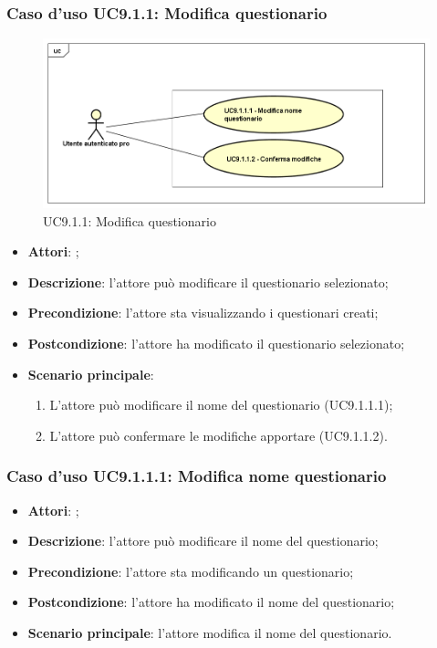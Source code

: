 			\subsubsection{Caso d'uso UC9.1.1: Modifica questionario}
			\label{UC9.1.1}
			\begin{figure}[h]
				\centering
			\includegraphics[scale=0.5,keepaspectratio]{UML/UC9_1_1.png}
				\caption{UC9.1.1: Modifica questionario}
			\end{figure}
			\FloatBarrier
			\begin{itemize}
				\item \textbf{Attori}: \uaupro{};
				\item \textbf{Descrizione}: l'attore può modificare il questionario selezionato;
				\item \textbf{Precondizione}: l'attore sta visualizzando i questionari creati;
				\item \textbf{Postcondizione}: l'attore ha modificato il questionario selezionato; 
				\item \textbf{Scenario principale}:
					\begin{enumerate}
						\item L'attore può modificare il nome del questionario (UC9.1.1.1);
						\item L'attore può confermare le modifiche apportare (UC9.1.1.2).
					\end{enumerate}
			\end{itemize}
								
					\subsubsection{Caso d'uso UC9.1.1.1: Modifica nome questionario}
					\label{UC9.1.1.1}
					\begin{itemize}
						\item \textbf{Attori}: \uaupro{};
						\item \textbf{Descrizione}: l'attore può modificare il nome del questionario; 
						\item \textbf{Precondizione}: l'attore sta modificando un questionario;
						\item \textbf{Postcondizione}: l'attore ha modificato il nome del questionario; 
						\item \textbf{Scenario principale}: l'attore modifica il nome del questionario.
					\end{itemize}
																					
